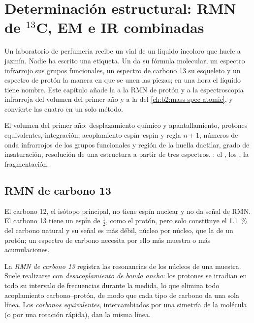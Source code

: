 \chapter{Determinación estructural: RMN de \texorpdfstring{$^{13}$C}{13C}, EM e IR combinadas}\label{ch:b2:structure-determination}

Un laboratorio de perfumería recibe un vial de un líquido incoloro que huele a jazmín. Nadie ha
escrito una etiqueta. Un  da su fórmula molecular, un espectro infrarrojo sus grupos
funcionales, un espectro de carbono 13 su esqueleto y un espectro de protón la manera en que se unen las piezas; en una
hora el líquido tiene nombre. Este capítulo añade la  a la RMN de protón y a la espectroscopia infrarroja
del volumen del primer año y a la  del \cref{ch:b2:mass-spec-atomic}, y convierte las cuatro
en un solo método.

\begin{recall}
El volumen del primer año: desplazamiento químico y apantallamiento, protones equivalentes, integración, acoplamiento espín--espín
y regla $n + 1$, números de onda infrarrojos de los grupos funcionales y región de la huella dactilar, grado
de insaturación, resolución de una estructura a partir de tres espectros. : el , los , la fragmentación.
\end{recall}

\section{RMN de carbono 13}

El carbono 12, el isótopo principal, no tiene espín nuclear y no da señal de RMN. El carbono 13 tiene un espín de
$\tfrac12$, como el protón, pero solo constituye el 1.1~\% del carbono natural y su señal es más débil,
núcleo por núcleo, que la de un protón; un espectro de carbono necesita por ello más muestra o más acumulaciones.

\begin{definition}\label{def:b2:structure-determination:c13}
La \emph{RMN de carbono 13} registra las resonancias de los núcleos  de una muestra.
Suele realizarse con \emph{desacoplamiento de banda ancha}: los protones se
irradian en todo su intervalo de frecuencias durante la medida, lo que elimina todo
acoplamiento carbono--protón, de modo que cada tipo de carbono da una sola línea. Los \emph{carbonos
equivalentes}, intercambiados por una simetría de la molécula (o por una rotación rápida),
dan la misma línea.
\end{definition}

